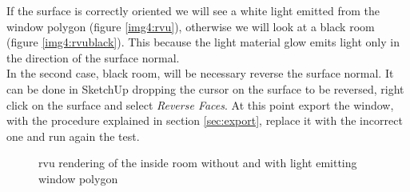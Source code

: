 If the surface is correctly oriented we will see a white light emitted from the window polygon (figure \ref{img4:rvu}), otherwise we will look at a black room (figure \ref{img4:rvublack}). This because the light material glow emits light only in the direction of the surface normal. \\
In the second case, black room, will be necessary reverse the surface normal. It can be done in SketchUp dropping the cursor on the surface to be reversed, right click on the surface and select \textit{Reverse Faces}. At this point export the window, with the procedure explained in section \ref{sec:export}, replace it with the incorrect one and run again the test.


\begin{figure}[h] 
\centering
  \caption{\label{img4:surfacenormal} rvu rendering of the inside room without and with light emitting window polygon }
\end{figure}
 




